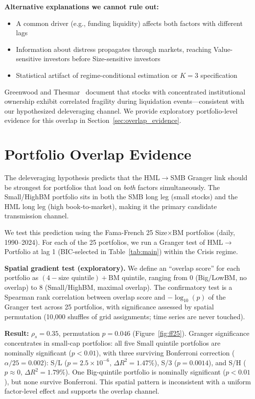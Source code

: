 \documentclass[sigconf,anonymous]{acmart}
\begin{document}
\textbf{Alternative explanations we cannot rule out:}
\begin{itemize}
    \item A common driver (e.g., funding liquidity) affects both factors with different lags
    \item Information about distress propagates through markets, reaching Value-sensitive
    investors before Size-sensitive investors
    \item Statistical artifact of regime-conditional estimation or $K = 3$ specification
\end{itemize}

Greenwood and Thesmar~\cite{greenwood2011stock} document that stocks with
concentrated institutional ownership exhibit correlated fragility during
liquidation events---consistent with our hypothesized deleveraging channel.
We provide exploratory portfolio-level evidence for this overlap in
Section~\ref{sec:overlap_evidence}.

\section{Portfolio Overlap Evidence}
\label{app:overlap}

The deleveraging hypothesis predicts that the HML$\to$SMB Granger link should
be strongest for portfolios that load on \emph{both} factors simultaneously.
The Small\-/HighBM portfolio sits in both the SMB long leg (small stocks) and
the HML long leg (high book-to-market), making it the primary candidate
transmission channel.

We test this prediction using the Fama-French 25 Size$\times$BM portfolios
(daily, 1990--2024). For each of the 25 portfolios, we run a Granger test
of HML$\to$Portfolio at lag 1 (BIC-selected in Table~\ref{tab:main}) within
the Crisis regime.

\textbf{Spatial gradient test (exploratory).} We define an ``overlap score'' for each
portfolio as $(4 - \text{size quintile}) + \text{BM quintile}$, ranging from
0 (Big/LowBM, no overlap) to 8 (Small/HighBM, maximal overlap). The
confirmatory test is a Spearman rank correlation between overlap score and
$-\log_{10}(p)$ of the Granger test across 25 portfolios, with significance
assessed by spatial permutation (10{,}000 shuffles of grid assignments;
time series are never touched).

\textbf{Result:} $\rho_s = 0.35$, permutation $p = 0.046$
(Figure~\ref{fig:ff25}). Granger significance concentrates in small-cap
portfolios: all five Small quintile portfolios are nominally significant
($p < 0.01$), with three surviving Bonferroni correction ($\alpha/25 = 0.002$):
S/L ($p = 2.5 \times 10^{-6}$, $\Delta R^2 = 1.47\%$),
S/3 ($p = 0.0014$), and S/H ($p \approx 0$, $\Delta R^2 = 1.79\%$).
One Big-quintile portfolio is nominally significant ($p < 0.01$), but none
survive Bonferroni. This spatial pattern is inconsistent
with a uniform factor-level effect and supports the overlap channel.
\end{document}
